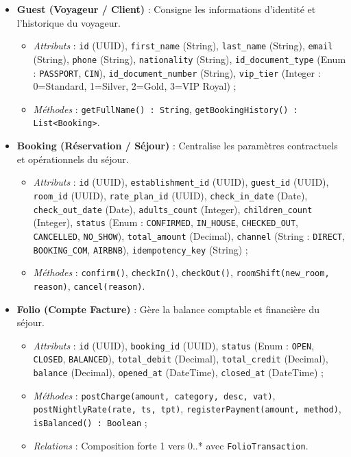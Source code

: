 \documentclass[12pt,a4paper,oneside]{report}
\begin{document}
\begin{itemize}
    \item \textbf{Guest (Voyageur / Client)} : Consigne les informations d'identité et l'historique du voyageur.
    \begin{itemize}
        \item \textit{Attributs} : \texttt{id} (UUID), \texttt{first\_name} (String), \texttt{last\_name} (String), \texttt{email} (String), \texttt{phone} (String), \texttt{nationality} (String), \texttt{id\_document\_type} (Enum : \texttt{PASSPORT}, \texttt{CIN}), \texttt{id\_document\_number} (String), \texttt{vip\_tier} (Integer : 0=Standard, 1=Silver, 2=Gold, 3=VIP Royal) ;
        \item \textit{Méthodes} : \texttt{getFullName() : String}, \texttt{getBookingHistory() : List<Booking>}.
    \end{itemize}

    \item \textbf{Booking (Réservation / Séjour)} : Centralise les paramètres contractuels et opérationnels du séjour.
    \begin{itemize}
        \item \textit{Attributs} : \texttt{id} (UUID), \texttt{establishment\_id} (UUID), \texttt{guest\_id} (UUID), \texttt{room\_id} (UUID), \texttt{rate\_plan\_id} (UUID), \texttt{check\_in\_date} (Date), \texttt{check\_out\_date} (Date), \texttt{adults\_count} (Integer), \texttt{children\_count} (Integer), \texttt{status} (Enum : \texttt{CONFIRMED}, \texttt{IN\_HOUSE}, \texttt{CHECKED\_OUT}, \texttt{CANCELLED}, \texttt{NO\_SHOW}), \texttt{total\_amount} (Decimal), \texttt{channel} (String : \texttt{DIRECT}, \texttt{BOOKING\_COM}, \texttt{AIRBNB}), \texttt{idempotency\_key} (String) ;
        \item \textit{Méthodes} : \texttt{confirm()}, \texttt{checkIn()}, \texttt{checkOut()}, \texttt{roomShift(new\_room, reason)}, \texttt{cancel(reason)}.
    \end{itemize}

    \item \textbf{Folio (Compte Facture)} : Gère la balance comptable et financière du séjour.
    \begin{itemize}
        \item \textit{Attributs} : \texttt{id} (UUID), \texttt{booking\_id} (UUID), \texttt{status} (Enum : \texttt{OPEN}, \texttt{CLOSED}, \texttt{BALANCED}), \texttt{total\_debit} (Decimal), \texttt{total\_credit} (Decimal), \texttt{balance} (Decimal), \texttt{opened\_at} (DateTime), \texttt{closed\_at} (DateTime) ;
        \item \textit{Méthodes} : \texttt{postCharge(amount, category, desc, vat)}, \texttt{postNightlyRate(rate, ts, tpt)}, \texttt{registerPayment(amount, method)}, \texttt{isBalanced() : Boolean} ;
        \item \textit{Relations} : Composition forte 1 vers 0..* avec \texttt{FolioTransaction}.
    \end{itemize}


\end{itemize}
\end{document}
